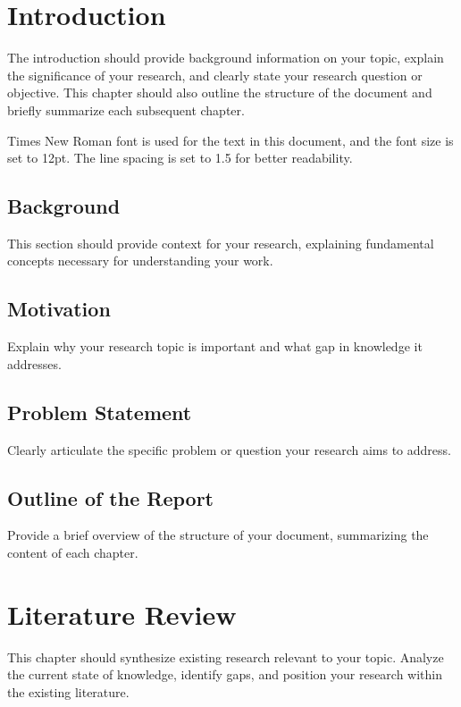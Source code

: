 \chapter{Introduction}
\label{chap:introduction}

The introduction should provide background information on your topic, explain the significance of your research, and clearly state your research question or objective. This chapter should also outline the structure of the document and briefly summarize each subsequent chapter.

Times New Roman font is used for the text in this document, and the font size is set to 12pt. The line spacing is set to 1.5 for better readability.

\section{Background}
This section should provide context for your research, explaining fundamental concepts necessary for understanding your work.

\section{Motivation}
Explain why your research topic is important and what gap in knowledge it addresses.

\section{Problem Statement}
Clearly articulate the specific problem or question your research aims to address.

\section{Outline of the Report}
Provide a brief overview of the structure of your document, summarizing the content of each chapter.

\chapter{Literature Review}
This chapter should synthesize existing research relevant to your topic. Analyze the current state of knowledge, identify gaps, and position your research within the existing literature.

